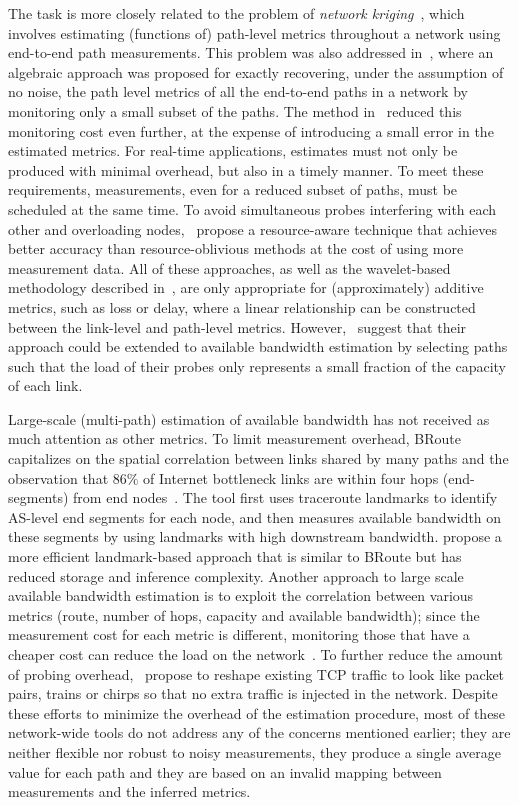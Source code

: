 \documentclass[final,5p,times,twocolumn]{elsarticle}
\begin{document}
The task is more closely related to the problem of {\em network kriging}~\cite{chu:06}, which involves estimating (functions of) path-level metrics throughout a network using end-to-end path measurements. This problem was also addressed in~\cite{che:03,che:07algebra}, where an algebraic approach was proposed for exactly recovering, under the assumption of no noise, the path level metrics of all the end-to-end paths in a network by monitoring only a small subset of the paths. The method in~\cite{chu:06} reduced this monitoring cost even further, at the expense of introducing a small error in the estimated metrics.  
For real-time applications, estimates must not only be produced with minimal overhead, but also in a timely manner.  To meet these requirements, measurements, even for a reduced subset of paths, must be scheduled at the same time.  
To avoid simultaneous probes interfering with each other and overloading nodes,~\citet{son:07} propose a resource-aware technique that achieves better accuracy than resource-oblivious methods at the cost of using more measurement data.
All of these approaches, as well as the wavelet-based methodology described in~\cite{coa:07}, are only appropriate for (approximately) additive metrics, such as loss or delay, where a linear relationship can be constructed between the link-level and path-level metrics.
However,~\citet{son:07} suggest that their approach could be extended to available bandwidth estimation by selecting paths such that the load of their probes only represents a small fraction of the capacity of each link.



Large-scale (multi-path) estimation of available bandwidth has not received as much attention as other metrics.
To limit measurement overhead, BRoute~\cite{hu:05} capitalizes on the spatial correlation between links shared by many paths and the observation that $86\%$ of Internet bottleneck links are within four hops (end-segments) from end nodes~\cite{hu:04}.  The tool first uses traceroute landmarks to identify AS-level end segments for each node, and then measures available bandwidth on these segments
by using landmarks with high downstream bandwidth.  \citet{man:07bandwidth} propose a more efficient landmark-based approach that is similar to BRoute but has reduced storage and inference complexity.
Another approach to large scale available bandwidth estimation is to exploit the correlation between various metrics (route, number of hops, capacity and available bandwidth); since the measurement cost for each metric is different, monitoring those that have a cheaper cost can reduce the load on the network~\cite{yal:08}.  
To further reduce the amount of probing overhead,~\citet{man:07inferring} propose to reshape existing TCP traffic to look like packet pairs, trains or chirps so that no extra traffic is injected in the network.  
Despite these efforts to minimize the overhead of the estimation procedure, most of these network-wide tools do not address any of the concerns mentioned earlier; they are neither flexible nor robust to noisy measurements, they produce a single average value for each path and they are based on an invalid mapping between measurements and the inferred metrics.
\end{document}
